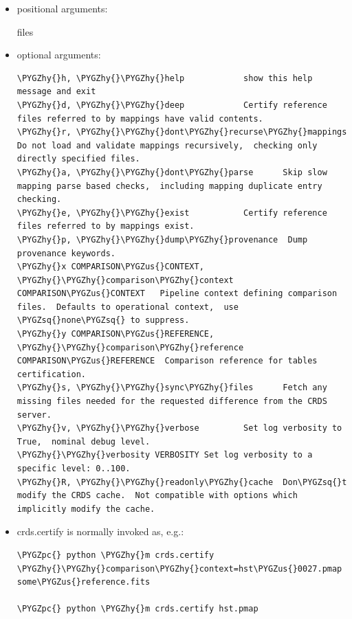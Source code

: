 \documentclass[letterpaper,10pt,english]{sphinxmanual}
\def\PYGZus{\char`\_}
\def\PYGZpc{\char`\%}
\def\PYGZhy{\char`\-}
\def\PYGZsq{\char`\'}
\begin{document}
\begin{itemize}
\item {} 
positional arguments:

files

\item {} 
optional arguments:

\begin{Verbatim}[commandchars=\\\{\}]
\PYGZhy{}h, \PYGZhy{}\PYGZhy{}help            show this help message and exit
\PYGZhy{}d, \PYGZhy{}\PYGZhy{}deep            Certify reference files referred to by mappings have valid contents.
\PYGZhy{}r, \PYGZhy{}\PYGZhy{}dont\PYGZhy{}recurse\PYGZhy{}mappings   Do not load and validate mappings recursively,  checking only directly specified files.
\PYGZhy{}a, \PYGZhy{}\PYGZhy{}dont\PYGZhy{}parse      Skip slow mapping parse based checks,  including mapping duplicate entry checking.
\PYGZhy{}e, \PYGZhy{}\PYGZhy{}exist           Certify reference files referred to by mappings exist.
\PYGZhy{}p, \PYGZhy{}\PYGZhy{}dump\PYGZhy{}provenance  Dump provenance keywords.
\PYGZhy{}x COMPARISON\PYGZus{}CONTEXT, \PYGZhy{}\PYGZhy{}comparison\PYGZhy{}context COMPARISON\PYGZus{}CONTEXT   Pipeline context defining comparison files.  Defaults to operational context,  use \PYGZsq{}none\PYGZsq{} to suppress.
\PYGZhy{}y COMPARISON\PYGZus{}REFERENCE, \PYGZhy{}\PYGZhy{}comparison\PYGZhy{}reference COMPARISON\PYGZus{}REFERENCE  Comparison reference for tables certification.
\PYGZhy{}s, \PYGZhy{}\PYGZhy{}sync\PYGZhy{}files      Fetch any missing files needed for the requested difference from the CRDS server.
\PYGZhy{}v, \PYGZhy{}\PYGZhy{}verbose         Set log verbosity to True,  nominal debug level.
\PYGZhy{}\PYGZhy{}verbosity VERBOSITY Set log verbosity to a specific level: 0..100.
\PYGZhy{}R, \PYGZhy{}\PYGZhy{}readonly\PYGZhy{}cache  Don\PYGZsq{}t modify the CRDS cache.  Not compatible with options which implicitly modify the cache.
\end{Verbatim}

\item {} 
crds.certify is normally invoked as, e.g.:

\begin{Verbatim}[commandchars=\\\{\}]
\PYGZpc{} python \PYGZhy{}m crds.certify \PYGZhy{}\PYGZhy{}comparison\PYGZhy{}context=hst\PYGZus{}0027.pmap   some\PYGZus{}reference.fits

\PYGZpc{} python \PYGZhy{}m crds.certify hst.pmap
\end{Verbatim}


\end{itemize}
\end{document}
